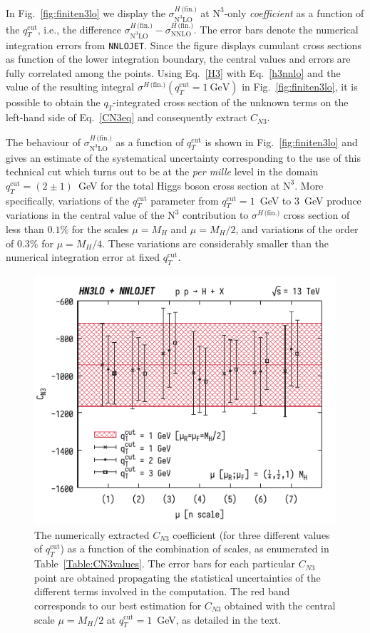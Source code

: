 \documentclass[12pt]{article}
\DeclareRobustCommand{\qt}{\ensuremath{q_T}\xspace}
\DeclareRobustCommand{\qtcut}{\ensuremath{q_T^\mathrm{cut}}\xspace}
\DeclareRobustCommand{\fin}{\text{(fin.)}\xspace}
\DeclareRobustCommand{\LO}{\text{LO}\xspace}
\DeclareRobustCommand{\NNLO}{\text{NNLO}\xspace}
\DeclareRobustCommand{\N}[1]{\ensuremath{\text{N}^{#1}}} %
\begin{document}
In Fig.~\ref{fig:finiten3lo} we display the $\sigma^{H\,\fin}_{\N3\LO}$ at \N3\LO-only \emph{coefficient} as a function of the $\qtcut$, i.e.,  the difference $\sigma^{H\,\fin}_{\N3\LO} - \sigma^{H\,\fin}_{\NNLO}$. 
The error bars denote the numerical integration errors from  \texttt{NNLOJET}. Since the figure displays cumulant cross sections as function of the lower integration boundary, the central values and errors are fully correlated among the points.
Using Eq.~\eqref{H3} with Eq.~\eqref{h3nnlo} and the value of the resulting integral $ \sigma^{H\,\fin}(\qtcut=1~\mathrm{GeV})$ in Fig.~\ref{fig:finiten3lo}, it is possible to obtain the $\qt$-integrated cross section of the unknown terms on the left-hand side of Eq.~\eqref{CN3eq} and consequently extract $C_{N3}$. 

The behaviour of $\sigma^{H\,\fin}_{\N3\LO}$ as a function of $\qtcut$ is shown in Fig.~\ref{fig:finiten3lo} and gives an estimate of the systematical uncertainty corresponding to the use of this technical cut which turns out to be at the \textit{per mille} level in the domain $\qtcut=(2\pm 1)$~GeV for the total Higgs boson cross section at \N3\LO. More specifically, variations of the $\qtcut$ parameter from $\qtcut=1$~GeV to 3~GeV produce variations in the central value of the 
\N3\LO contribution to $\sigma^{H\,\fin}$ cross section of less than $0.1\%$ for the scales $\mu=M_{H}$ and $\mu=M_{H}/2$, and variations of the order of $0.3\%$ for $\mu=M_{H}/4$. These variations are considerably smaller than the numerical integration error at fixed $\qtcut$. 

\begin{figure}
\centering
\includegraphics[width=.6\linewidth]{./JHEP_figures/CN3_new_7_point_qT1_qT2_qT3}
\caption{\label{fig:CN3qT}{The numerically extracted $C_{N3}$ coefficient (for three different values of $\qtcut$) as a function of the combination of scales, as enumerated in Table~\ref{Table:CN3values}.
The error bars for each particular $C_{N3}$ point are obtained propagating the statistical uncertainties of the different terms involved in the computation. The red band corresponds to our best estimation for $C_{N3}$ obtained with the central scale $\mu=M_{H}/2$ at $\qtcut=1$~GeV, as detailed in the text.}}
\end{figure}
\end{document}
